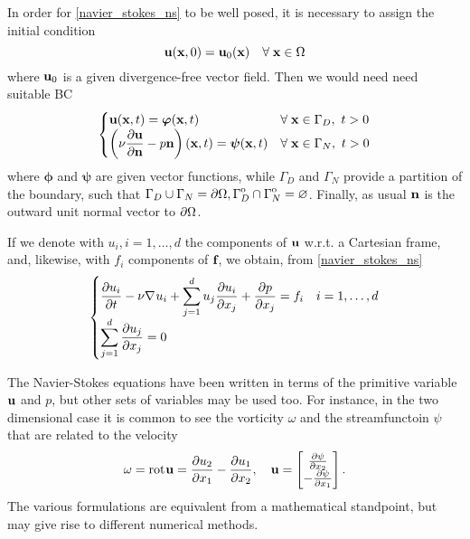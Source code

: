 In order for \eqref{navier_stokes_ns} to be well posed, it is necessary to assign the initial condition 
\begin{equation}
    \textbf{u}(\textbf{x}, 0) = \textbf{u}_0(\textbf{x}) \quad \forall \; \textbf{x} \in \Omega
    \label{initial_condition_ns}
\end{equation}
where \(\textbf{u}_0\) is a given divergence-free vector field. Then we would need need suitable BC
\begin{equation}
    \begin{cases}
        \uvec(\xvec, t) = \bm{\phi}(\xvec, t) & \forall \; \xvec \in \Gamma_D, \ t > 0 \\
        \displaystyle \left( \nu \partialderivative{\uvec}{\vect{n}} - p\normal  \right)\left( \xvec, t \right) = \bm{\psi}(\xvec, t) & \forall \; \xvec \in \Gamma_N, \ t > 0 
    \end{cases}
    \label{boundaries_ns}
\end{equation}
where \(\bm{\phi}\) and \(\bm{\psi}\) are given vector functions, while \(\Gamma_D\) and \(\Gamma_N\) provide a partition of the boundary, such that \(\Gamma_D \cup \Gamma_N = {\partial\Omega}, {\kern0pt\Gamma}^{\mathrm{o}}_D \cap {\kern0pt\Gamma}^{\mathrm{o}}_N =\varnothing\).
Finally, as usual \(\textbf{n}\) is the outward unit normal vector to \({\partial\Omega}\).

If we denote with \(u_i, i = 1,\ldots, d\) the components of \(\textbf{u}\) w.r.t. a Cartesian frame, and, likewise, with \(f_i\) components of \(\textbf{f}\), we obtain, from \eqref{navier_stokes_ns}
\[
    \begin{cases}
        \displaystyle \partialderivative{u_i}{t} - \nu \grad u_i + \sum_{j=1}^{d} u_j\partialderivative{u_i}{x_j} + \partialderivative{p}{x_j} = f_i & i = 1,\ldots, d \\
        \displaystyle \sum_{j=1}^{d} \partialderivative{u_j}{x_j} = 0
    \end{cases}
\]
\begin{remark}
    The Navier-Stokes equations have been written in terms of the primitive variable \(\textbf{u}\) and \(p\), but other sets of variables may be used too. For instance, in the two dimensional case it is common to see the vorticity \(\omega\) and the streamfunctoin \(\psi\) that are related to the velocity
    \begin{equation*}
        \omega =\rot\uvec = \partialderivative{u_2}{x_1} - \partialderivative{u_1}{x_2}, \quad \uvec = \left[ \begin{matrix*}
            \partialderivative{\psi}{x_2} \\
            -\partialderivative{\psi}{x_1}
        \end{matrix*} \right].
    \end{equation*}
    The various formulations are equivalent from a mathematical standpoint, but may give rise to different numerical methods.
\end{remark}
